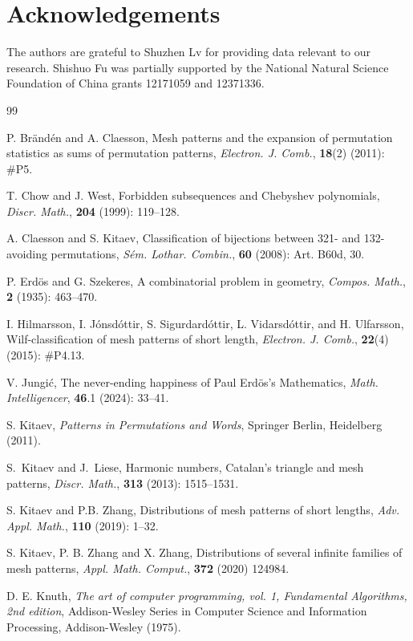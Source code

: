 \documentclass[12pt,reqno]{article}
\numberwithin{equation}{section}
\theoremstyle{plain}
\theoremstyle{definition}
\begin{document}
\section*{Acknowledgements}
The authors are grateful to Shuzhen Lv for providing data relevant to our research. Shishuo Fu was partially supported by the National Natural Science Foundation of China grants 12171059 and 12371336.

\begin{thebibliography}{99}

 P. Br\"and\'en and A. Claesson, Mesh patterns and the expansion of permutation statistics as sums of permutation patterns, {\it Electron. J. Comb.}, {\bf18}(2) (2011): \#P5.

 T. Chow and J. West, Forbidden subsequences and Chebyshev polynomials, {\it Discr. Math.}, {\bf204} (1999): 119--128.

 A. Claesson and S. Kitaev, Classification of bijections between 321- and 132-avoiding permutations, {\it S\'em. Lothar. Combin.}, {\bf60} (2008): Art. B60d, 30.

 P. Erd\"os and G. Szekeres, A combinatorial problem in geometry, \emph{Compos. Math.}, {\bf2} (1935): 463--470.

 I. Hilmarsson, I. J\'onsd\'ottir, S. Sigurdard\'ottir, L. Vidarsd\'ottir, and H. Ulfarsson, Wilf-classification of mesh patterns of short length, {\it Electron. J. Comb.}, {\bf22}(4) (2015): \#P4.13.

 V. Jungi\'c, The never-ending happiness of Paul Erd\"os's Mathematics, \emph{Math. Intelligencer}, {\bf46}.1 (2024): 33--41.


    
 S. Kitaev, {\it Patterns in Permutations and Words}, Springer Berlin, Heidelberg (2011).

 S.~Kitaev and J.~Liese, Harmonic numbers, Catalan's triangle and mesh patterns, {\em Discr. Math.}, {\bf313} (2013): 1515--1531.

 S. Kitaev and P.B. Zhang, Distributions of mesh patterns of short lengths, {\it Adv. Appl. Math.}, {\bf110} (2019): 1--32.

 S. Kitaev, P. B. Zhang and X. Zhang, Distributions of several infinite families of mesh patterns, {\em Appl. Math. Comput.}, {\bf 372} (2020) 124984.

 D. E. Knuth, {\it The art of computer programming, vol. 1, Fundamental Algorithms, 2nd edition}, Addison-Wesley Series in Computer Science and Information Processing, Addison-Wesley (1975).  


\end{thebibliography}
\end{document}
